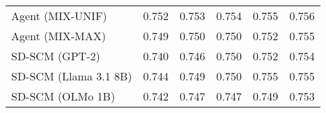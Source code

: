 \begin{table}[h!]
\begin{tabular}{lccccc}
    Agent (MIX-UNIF) & \cellcolor{silver!30}0.752 & \cellcolor{silver!30}0.753 & 0.754 & 0.755 & 0.756 \\
    Agent (MIX-MAX) & 0.749 & 0.750 & 0.750 & 0.752 & 0.755 \\
    \arrayrulecolor{black!50!}\midrule
    SD-SCM (GPT-2) & 0.740 & 0.746 & 0.750 & 0.752 & 0.754 \\
    SD-SCM (Llama 3.1 8B) & 0.744 & 0.749 & 0.750 & 0.755 & 0.755 \\
    SD-SCM (OLMo 1B) & 0.742 & 0.747 & 0.747 & 0.749 & 0.753 \\
    \bottomrule
    \end{tabular}
\end{table}